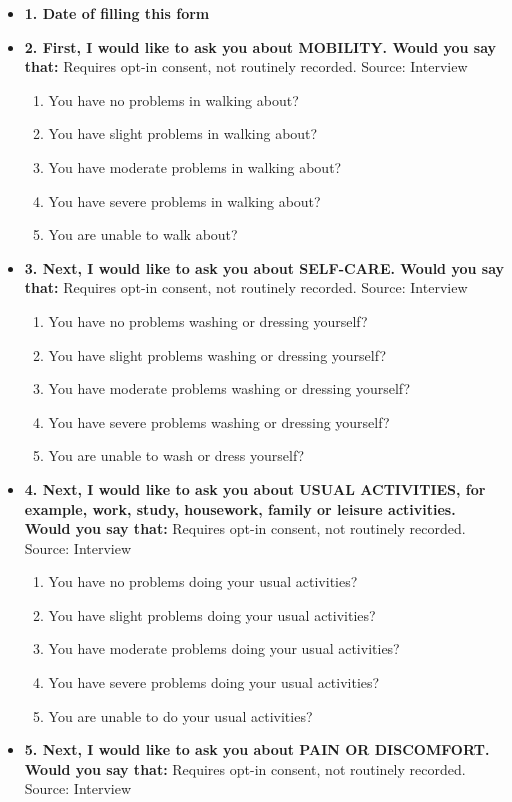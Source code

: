 \documentclass[
]{scrartcl}
\providecommand{\tightlist}{%
  \setlength{\itemsep}{0pt}\setlength{\parskip}{0pt}}\usepackage{longtable,booktabs,array}
\begin{document}
\begin{itemize}
\item
  \textbf{1. Date of filling this form}
\item
  \textbf{2. First, I would like to ask you about MOBILITY. Would you
  say that:} Requires opt-in consent, not routinely recorded. Source:
  Interview

  \begin{enumerate}
  \def\labelenumi{\arabic{enumi}.}
  \tightlist
  \item
    You have no problems in walking about?
  \item
    You have slight problems in walking about?
  \item
    You have moderate problems in walking about?
  \item
    You have severe problems in walking about?
  \item
    You are unable to walk about?
  \end{enumerate}
\item
  \textbf{3. Next, I would like to ask you about SELF-CARE. Would you
  say that:} Requires opt-in consent, not routinely recorded. Source:
  Interview

  \begin{enumerate}
  \def\labelenumi{\arabic{enumi}.}
  \tightlist
  \item
    You have no problems washing or dressing yourself?
  \item
    You have slight problems washing or dressing yourself?
  \item
    You have moderate problems washing or dressing yourself?
  \item
    You have severe problems washing or dressing yourself?
  \item
    You are unable to wash or dress yourself?
  \end{enumerate}
\item
  \textbf{4. Next, I would like to ask you about USUAL ACTIVITIES, for
  example, work, study, housework, family or leisure activities. Would
  you say that:} Requires opt-in consent, not routinely recorded.
  Source: Interview

  \begin{enumerate}
  \def\labelenumi{\arabic{enumi}.}
  \tightlist
  \item
    You have no problems doing your usual activities?
  \item
    You have slight problems doing your usual activities?
  \item
    You have moderate problems doing your usual activities?
  \item
    You have severe problems doing your usual activities?
  \item
    You are unable to do your usual activities?
  \end{enumerate}
\item
  \textbf{5. Next, I would like to ask you about PAIN OR DISCOMFORT.
  Would you say that:} Requires opt-in consent, not routinely recorded.
  Source: Interview


\end{itemize}
\end{document}
